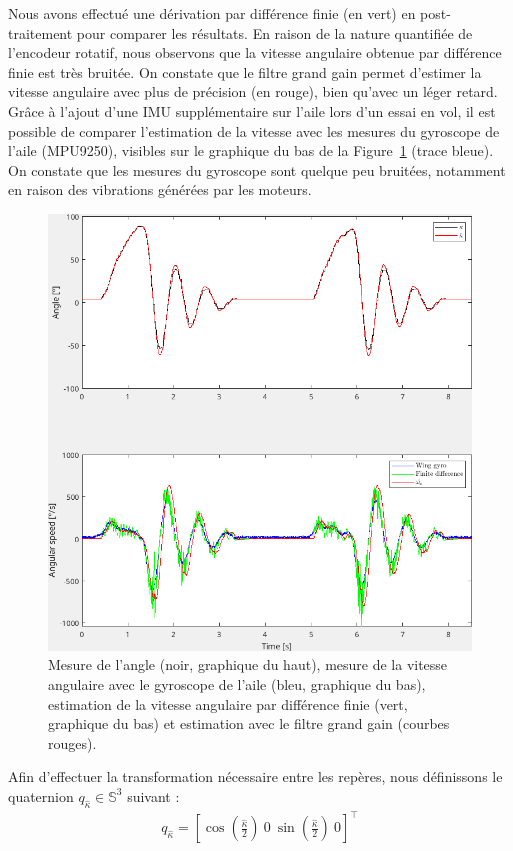 Nous avons effectué une dérivation par différence finie (en vert) en post-traitement pour comparer les résultats. En raison de la nature quantifiée de l'encodeur rotatif, nous observons que la vitesse angulaire obtenue par différence finie est très bruitée. On constate que le filtre grand gain permet d'estimer la vitesse angulaire avec plus de précision (en rouge), bien qu'avec un léger retard. Grâce à l'ajout d'une IMU supplémentaire sur l'aile lors d'un essai en vol, il est possible de comparer l'estimation de la vitesse avec les mesures du gyroscope de l'aile (MPU9250), visibles sur le graphique du bas de la Figure~\ref{fig:high_gain} (trace bleue). On constate que les mesures du gyroscope sont quelque peu bruitées, notamment en raison des vibrations générées par les moteurs. 

\begin{figure}[ht!]
\centering
    \includegraphics[width=0.6\columnwidth,angle=0]{figures/highGainFilter.png}
    \caption{Mesure de l'angle (noir, graphique du haut), mesure de la vitesse angulaire avec le gyroscope de l'aile (bleu, graphique du bas), estimation de la vitesse angulaire par différence finie (vert, graphique du bas) et estimation avec le filtre grand gain (courbes rouges).}
    \label{fig:high_gain}
\end{figure}

Afin d'effectuer la transformation nécessaire entre les repères, nous définissons le quaternion $q_{\hat{\kappa}} \in {\mathbb S}^3$ suivant :
\begin{align}
\label{eq:rot_quat}
    q_{\hat{\kappa}} =  \left[\cos\left(\frac{\hat{\kappa}}{2}\right) ~ 0 ~ \sin\left(\frac{\hat{\kappa}}{2}\right) ~ 0 \right]^\top
\end{align}


